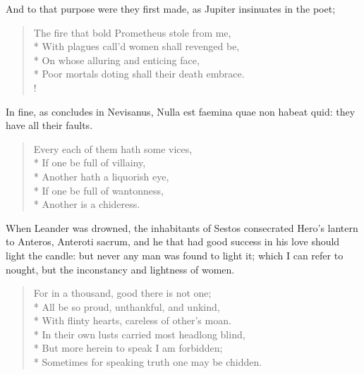 And to that purpose were they first made, as Jupiter insinuates in the poet;

\begin{verse}
The fire that bold Prometheus stole from me,\\*
With plagues call'd women shall revenged be,\\*
On whose alluring and enticing face,\\*
Poor mortals doting shall their death embrace.\\!
\end{verse}

In fine, as \Diogenes concludes in Nevisanus, Nulla est faemina quae non
habeat quid: they have all their faults.
%
{\gothfont
\begin{verse}
Every each of them hath some vices,\\*
If one be full of villainy,\\*
Another hath a liquorish eye,\\*
If one be full of wantonness,\\*
Another is a chideress.
\end{verse}
}

When Leander was drowned, the inhabitants of Sestos consecrated Hero's
lantern to Anteros, Anteroti sacrum, and he that had good success
in his love should light the candle: but never any man was found to
light it; which I can refer to nought, but the inconstancy and
lightness of women.
%
\begin{verse}
For in a thousand, good there is not one;\\*
All be so proud, unthankful, and unkind,\\*
With flinty hearts, careless of other's moan.\\*
In their own lusts carried most headlong blind,\\*
But more herein to speak I am forbidden;\\*
Sometimes for speaking truth one may be chidden.
\end{verse}
%

